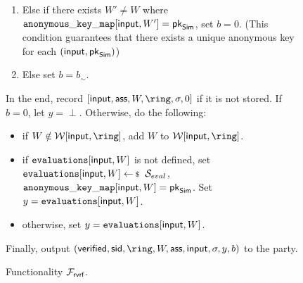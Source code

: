\begin{figure}
\begin{tcolorbox}[left=2pt,right=2pt]
{\begin{list}{\hspace*{1pt} C}{\setlength\leftmargin{0.15in}}
\begin{enumerate}
					\item Else if there exists $ W' \neq W $ where  $ \mathtt{anonymous\_key\_map}[\mathsf{input},W'] = \mathsf{pk}_{\mathsf{Sim}} $, set $ b = 0 $. \label{cond:differentWforsamepk} (This condition guarantees that there exists a unique anonymous key for each $ (\mathsf{input}, \mathsf{pk}_{\mathsf{Sim}}) $)
					\item Else set $ b = b_\sim$. \label{cond:simulatorbit}
				\end{enumerate}		

			\end{list}
			In the end,  record $ [\msg,\aux,W,\ring,\sigma, 0] $ if it is not stored. If $ b = 0 $, let $y = \perp $. Otherwise,   do the following:
			\begin{itemize}
				\item if $ W \notin \anonymouskeylist[\msg,\ring] $, add $ W $ to $ \anonymouskeylist[\msg,\ring]  $.
				\item if $ \texttt{evaluations}[\mathsf{input},W] $ is not defined, set $ \evaluationslist[\msg, W]\leftsample \setsym{S}_{eval}$, $ \mathtt{anonymous\_key\_map}[\mathsf{input},W]  = \mathsf{pk}_{\mathsf{Sim}}$.  Set $ y= \texttt{evaluations}[\mathsf{input}, W]$.
				\item otherwise, set $ y = \texttt{evaluations}[\mathsf{input}, W]$. 	
			\end{itemize}
			Finally, output $(\oramsg{verified}, \sid, \ring,W, \aux,\msg, \sigma, y, b)$ to the party.
			
	

	}
\end{tcolorbox}
\caption{Functionality $\mathcal{F}_{\textsf{rvrf}}$.\label{f:gvrf}}
\end{figure}



